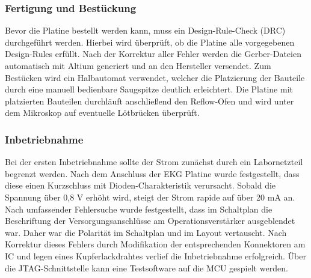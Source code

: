 \subsubsection{Fertigung und Bestückung}
Bevor die Platine bestellt werden kann, muss ein Design-Rule-Check (DRC) durchgeführt werden. Hierbei wird überprüft, ob die Platine alle vorgegebenen Design-Rules erfüllt. Nach der Korrektur aller Fehler werden die Gerber-Dateien automatisch mit Altium generiert und an den Hersteller versendet.
Zum Bestücken wird ein Halbautomat verwendet, welcher die Platzierung der Bauteile durch eine manuell bedienbare Saugspitze deutlich erleichtert. Die Platine mit platzierten Bauteilen durchläuft anschließend den Reflow-Ofen und wird unter dem Mikroskop auf eventuelle Lötbrücken überprüft.

\subsubsection{Inbetriebnahme}
Bei der ersten Inbetriebnahme sollte der Strom zunächst durch ein Labornetzteil begrenzt werden. Nach dem Anschluss der EKG Platine wurde festgestellt, dass diese einen Kurzschluss mit Dioden-Charakteristik verursacht. Sobald die Spannung über 0,8 V erhöht wird, steigt der Strom rapide auf über 20 mA an. Nach umfassender Fehlersuche wurde festgestellt, dass im Schaltplan die Beschriftung der Versorgungsanschlüsse am Operationsverstärker ausgeblendet war. Daher war die Polarität im Schaltplan und im Layout vertauscht. Nach Korrektur dieses Fehlers durch Modifikation der entsprechenden Konnektoren am IC und legen eines Kupferlackdrahtes verlief die Inbetriebnahme erfolgreich. Über die JTAG-Schnittstelle kann eine Testsoftware auf die MCU gespielt werden.